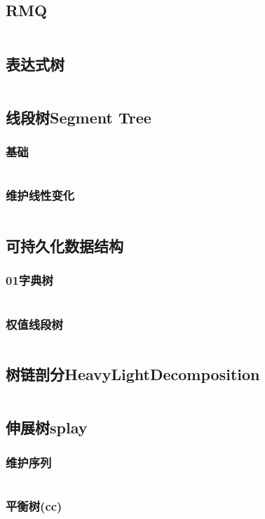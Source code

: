 \documentclass[twoside,sub3section,UTF8]{ctexart}						%
\begin{document}
	\subsection{RMQ}
		\inputminted{c++}{"Data Structure/RMQ.cpp"}
	\subsection{表达式树}
		\inputminted{c++}{"Data Structure/ExpressionTree.cpp"}
	\subsection{线段树Segment Tree}
		\subsubsection{基础}
			\inputminted{c++}{"Data Structure/segmentTree/segmentTree.cpp"}
		\subsubsection{维护线性变化}
			\inputminted{c++}{"Data Structure/segmentTree/pushdown.cpp"}
	\subsection{可持久化数据结构}
		\subsubsection{01字典树}
			\inputminted{c++}{"Data Structure/Presistence/01Dictionary.cpp"}
		\subsubsection{权值线段树}
			\inputminted{c++}{"Data Structure/Presistence/HJT.cpp"}
	\subsection{树链剖分HeavyLightDecomposition}
		\inputminted{c++}{"Data Structure/HeavyLightDecomposition.cpp"}
	\subsection{伸展树splay}
		\subsubsection{维护序列}
			\inputminted{c++}{"Data Structure/splay.cpp"}
		\subsubsection{平衡树(cc)}
			\inputminted{c++}{"Data Structure/Rank tree.cpp"}
\end{document}
